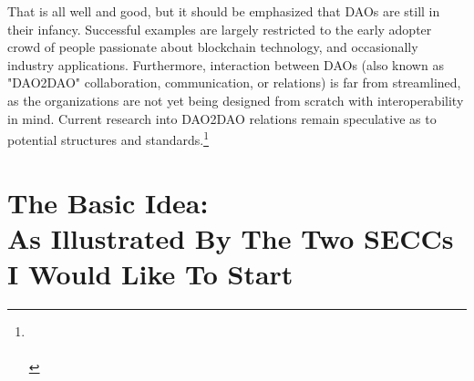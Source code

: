 \documentclass{article}[10pt]
\begin{document}
That is all well and good, but it should be emphasized that DAOs are still in their infancy. 
Successful examples are largely restricted to the early adopter crowd of people passionate about blockchain technology, and occasionally industry applications. 
Furthermore, interaction between DAOs (also known as "DAO2DAO" collaboration, communication, or relations) is far from streamlined, as the organizations are not yet being designed from scratch with interoperability in mind.
Current research into DAO2DAO relations remain speculative as to potential structures and standards.\footnote{
    \\
    \indent \indent {}\\
    \indent \indent {}}



\section{The Basic Idea: \\
As Illustrated By The Two SECCs I Would Like To Start}
\label{section:TheBasicIdea}
\end{document}
